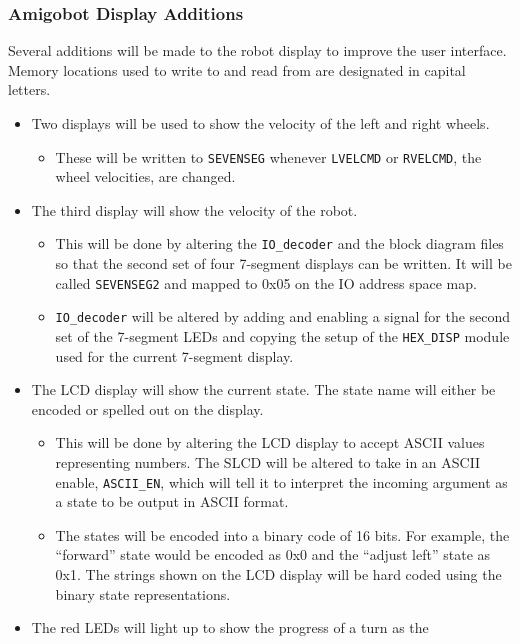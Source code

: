 \subsubsection{Amigobot Display Additions}\label{xtras}
Several additions will be made to the robot display to improve the
user interface. Memory locations used to write to and read from are designated in capital letters. 
\begin{itemize}
\item Two displays will be used to show the velocity of the left and
  right wheels.
  \begin{itemize}
  \item These will be written to \verb+SEVENSEG+ whenever \verb+LVELCMD+ or \verb+RVELCMD+,
    the wheel velocities, are changed.
  \end{itemize}
\item The third display will show the velocity of the robot.
  \begin{itemize}
  \item This will be done by altering the \verb+IO_decoder+ and the
    block diagram
    files so that the second set of four 7-segment displays can be
    written. It will be called \verb+SEVENSEG2+ and mapped to 0x05 on the
    IO address space map.
  \item\verb+IO_decoder+ will be altered by adding and enabling a signal
    for the second set of the 7-segment LEDs and copying the setup of
    the \verb+HEX_DISP+ module used for the current 7-segment display.
  \end{itemize}
\item The LCD display will show the current state. The state name will
  either be encoded or spelled out on the display.
  \begin{itemize}
  \item This will be done by altering the LCD display to accept ASCII
    values representing numbers. The SLCD will be altered to take in
    an ASCII enable, \verb+ASCII_EN+, which will tell it to interpret the
    incoming argument as a state to be output in ASCII format.
  \item The states will be encoded into a binary code of 16 bits. For
    example, the ``forward'' state would be encoded as 0x0 and the
    ``adjust left'' state as
    0x1. The strings shown on the LCD display will be hard coded using
    the binary state representations.
  \end{itemize}
\item The red LEDs will light up to show the progress of a turn as the

\end{itemize}
